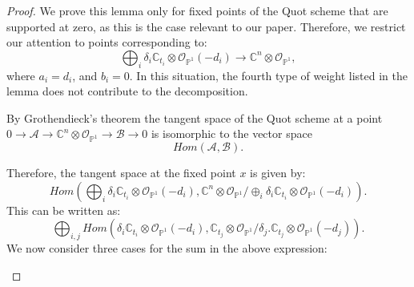 \documentclass{amsart}
\begin{document}
 \begin{proof}
 We prove this lemma only for fixed points of the Quot scheme that are supported at zero, as this is the case relevant to our paper. Therefore, we restrict our attention to points corresponding to: 
 \[
 \bigoplus_i \delta_i\mathbb{C}_{t_i} \otimes \mathcal{O}_{\mathbb{P}^1}(-d_i) \to \mathbb{C}^n \otimes \mathcal{O}_{\mathbb{P}^1},
 \]
 where $a_i = d_i$, and $b_i=0$. In this situation, the fourth type of weight listed in the lemma does not contribute to the decomposition.
 
    By Grothendieck's theorem \cite[cor 5.3]{GRo} the tangent space of the Quot scheme at a point $0 \to \mathcal{A} \to \mathbb{C}^n \otimes \mathcal{O}_{\mathbb{P}^1} \to \mathcal{B} \to 0$ is isomorphic to the vector space
    \[
    Hom(\mathcal{A},\mathcal{B}).
    \]

Therefore, the tangent space at the fixed point $x$ is given by:
\[
Hom(\bigoplus_i \delta_i\mathbb{C}_{t_i} \otimes \mathcal{O}_{\mathbb{P}^1}(-d_i),\mathbb{C}^n \otimes \mathcal{O}_{\mathbb{P}^1}/\oplus_i \delta_i\mathbb{C}_{t_i} \otimes \mathcal{O}_{\mathbb{P}^1}(-d_i)). 
\]
This can be written as:
\begin{equation} \label{Tangent Decomposition}
    \bigoplus_{i,j} Hom(\delta_i\mathbb{C}_{t_i} \otimes \mathcal{O}_{\mathbb{P}^1}(-d_i),\mathbb{C}_{t_j} \otimes\mathcal{O}_{\mathbb{P}^1} /\delta_j.\mathbb{C}_{t_j} \otimes \mathcal{O}_{\mathbb{P}^1}(-d_j)).
\end{equation}
We now consider three cases for the sum in the above expression:\\

\begin{itemize}


\end{itemize}
\end{proof}
\end{document}
